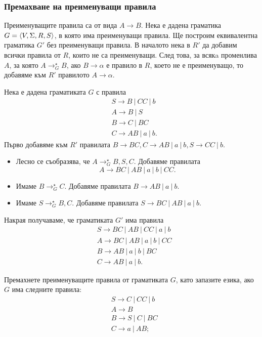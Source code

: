 \subsubsection*{Премахване на преименуващи правила}
Преименуващите правила са от вида $A \to B$.
Нека е дадена граматика $G = \langle{V,\Sigma,R,S}\rangle$, в която има преименуващи правила.
Ще построим еквивалентна граматика $G'$ без преименуващи правила.
В началото нека в $R'$ да добавим всички правила от $R$, които не са преименуващи.
След това, за всякa променлива $A$, за която $A \to^\star_G B$,
ако $B \to \alpha$ е правило в $R$, което не е преименуващо,
то добавяме към $R'$ правилото $A \to \alpha$.

\begin{example}
  Нека е дадена граматиката $G$ с правила  
  \begin{align*}
    & S \to B\ |\ CC\ |\ b\\
    & A \to B\ |\ S\\
    & B \to C\ |\ BC\\
    & C \to AB\ |\ a\ |\ b.
  \end{align*}
  Първо добавяме към $R'$ правилата $B \to BC, C \to AB\ |\ a\ |\ b, S \to CC\ |\ b$.
  \begin{itemize}
  \item 
    Лесно се съобразява, че $A \to^\star_G B,S,C$.
    Добавяме правилата 
    \[A \to BC\ |\ AB\ |\ a\ |\ b\ |\ CC.\]
  \item
    Имаме $B \to^\star_G C$.
    Добавяме правилата $B \to AB\ |\ a\ |\ b$.
  \item
    Имаме $S \to^\star_G B,C$.
    Добавяме правилата $S \to BC\ |\ AB\ |\ a\ |\ b$.
  \end{itemize}
  Накрая получаваме, че граматиката $G'$ има правила
  \begin{align*}
    & S \to BC\ |\ AB\ |\ CC\ |\ a\ |\ b\\
    & A \to BC\ |\ AB\ |\ a\ |\ b\ |\ CC\\
    & B \to AB\ |\ a\ |\ b\ |\ BC\\
    & C \to AB\ |\ a\ |\ b.
  \end{align*}
\end{example}

\begin{problem}
  Премахнете преименуващите правила от граматиката $G$, като запазите езика, ако $G$ има следните правила:
    \begin{align*}
      & S \to C\ |\ CC\ |\ b\\
      & A \to B\\
      & B \to S\ |\ C\ |\ BC\\
      & C \to a\ |\ AB;
    \end{align*}
\end{problem}

